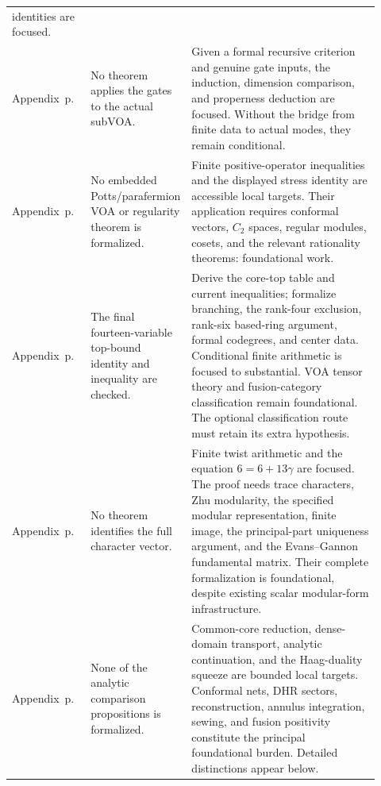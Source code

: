 \begin{longtable}{@{}P{0.15\linewidth}P{0.25\linewidth}P{0.52\linewidth}@{}}
identities are focused.\\
Appendix~\newline p.~
& No theorem applies the gates to the actual subVOA.
& Given a formal recursive criterion and genuine gate inputs, the
induction, dimension comparison, and properness deduction are focused.
Without the bridge from finite data to actual modes, they remain
conditional.\\
Appendix~\newline p.~
& No embedded Potts/parafermion VOA or regularity theorem is formalized.
& Finite positive-operator inequalities and the displayed stress
identity are accessible local targets. Their application requires
conformal vectors, $C_2$ spaces, regular modules, cosets, and the
relevant rationality theorems: foundational work.\\
Appendix~\newline p.~
& The final fourteen-variable top-bound identity and inequality are
checked.
& Derive the core-top table and current inequalities; formalize
branching, the rank-four exclusion, rank-six based-ring argument,
formal codegrees, and center data. Conditional finite arithmetic is
focused to substantial. VOA tensor theory and fusion-category
classification remain foundational. The optional classification
route must retain its extra hypothesis.\\
Appendix~\newline p.~
& No theorem identifies the full character vector.
& Finite twist arithmetic and the equation $6=6+13\gamma$ are focused.
The proof needs trace characters, Zhu modularity, the specified
modular representation, finite image, the principal-part uniqueness
argument, and the Evans--Gannon fundamental matrix. Their complete
formalization is foundational, despite existing scalar modular-form
infrastructure.\\
Appendix~\newline p.~
& None of the analytic comparison propositions is formalized.
& Common-core reduction, dense-domain transport, analytic continuation,
and the Haag-duality squeeze are bounded local targets. Conformal
nets, DHR sectors, reconstruction, annulus integration, sewing, and
fusion positivity constitute the principal foundational burden.
Detailed distinctions appear below.\\

\end{longtable}
